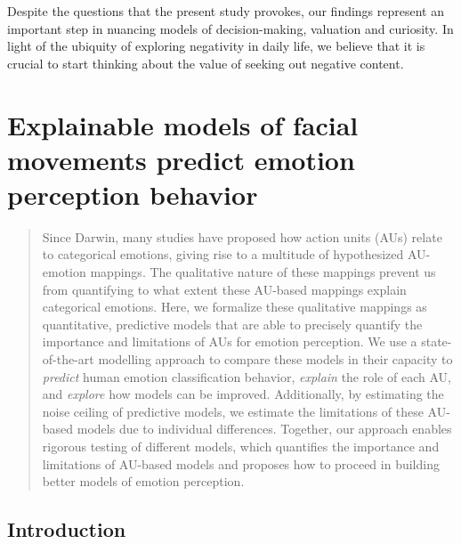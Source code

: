 \documentclass[12pt,american,a4paper,oneside,]{memoir} %
\begin{document}
Despite the questions that the present study provokes, our findings represent an important step in nuancing models of decision-making, valuation and curiosity. In light of the ubiquity of exploring negativity in daily life, we believe that it is crucial to start thinking about the value of seeking out negative content.

\hypertarget{hypothesis-kernel-analysis}{%
\chapter{Explainable models of facial movements predict emotion perception behavior}\label{hypothesis-kernel-analysis}}


\newpage
\normalsize

\begin{abstract}
Since Darwin, many studies have proposed how action units (AUs) relate to categorical emotions, giving rise to a multitude of hypothesized AU-emotion mappings. The qualitative nature of these mappings prevent us from quantifying to what extent these AU-based mappings explain categorical emotions. Here, we formalize these qualitative mappings as quantitative, predictive models that are able to precisely quantify the importance and limitations of AUs for emotion perception. We use a state-of-the-art modelling approach to compare these models in their capacity to \emph{predict} human emotion classification behavior, \emph{explain} the role of each AU, and \emph{explore} how models can be improved. Additionally, by estimating the noise ceiling of predictive models, we estimate the limitations of these AU-based models due to individual differences. Together, our approach enables rigorous testing of different models, which quantifies the importance and limitations of AU-based models and proposes how to proceed in building better models of emotion perception.
\end{abstract} \newpage

\hypertarget{hka-introduction}{%
\section{Introduction}\label{hka-introduction}}
\end{document}
